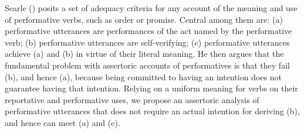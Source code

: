 Searle (\cite*{searle1989-lingphil}) posits a set of adequacy criteria for any account of the meaning and use of performative verbs, such as order or promise. Central among them are: (a) performative utterances are performances of the act named by the performative verb; (b) performative utterances are self-verifying; (c) performative utterances achieve (a) and (b) in virtue of their literal meaning. He then argues that the fundamental problem with assertoric accounts of performatives is that they fail (b), and hence (a), because being committed to having an intention does not guarantee having that intention. Relying on a uniform meaning for verbs on their reportative and performative uses, we propose an assertoric analysis of performative utterances that does not require an actual intention for deriving (b), and hence can meet (a) and (c).
\endinput